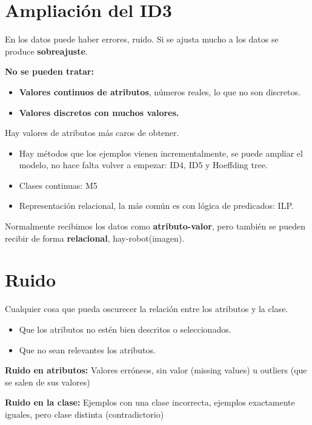 \documentclass[12pt, twoside, openright]{report} %
\begin{document}
\section{Ampliación del ID3}

En los datos puede haber errores, ruido. Si se ajusta mucho a los datos
se produce \textbf{sobreajuste}.

\textbf{No se pueden tratar:}

\begin{itemize}
	\item \textbf{Valores continuos de atributos}, números reales, lo que no son
	      discretos.
	\item \textbf{Valores discretos con muchos valores.}
\end{itemize}

Hay valores de atributos más caros de obtener.

\begin{itemize}
	\item Hay métodos que los ejemplos vienen incrementalmente, se puede ampliar el modelo, no hace falta volver a empezar: ID4, ID5 y Hoeffding tree.
	\item Clases continuas: M5
	\item Representación relacional, la más común es con lógica de predicados:
	      ILP.
\end{itemize}

Normalmente recibimos los datos como \textbf{atributo-valor}, pero
también se pueden recibir de forma \textbf{relacional}, hay-robot(imagen).

\section{Ruido}

Cualquier cosa que pueda oscurecer la relación entre los atributos y la
clase.

\begin{itemize}
	\item Que los atributos no estén bien descritos o seleccionados.
	\item Que no sean relevantes los atributos.
\end{itemize}

\textbf{Ruido en atributos:} Valores erróneos, sin valor (missing values) u outliers (que se salen de sus valores)

\textbf{Ruido en la clase:} Ejemplos con una clase incorrecta, ejemplos
exactamente iguales, pero clase distinta (contradictorio)
\end{document}
